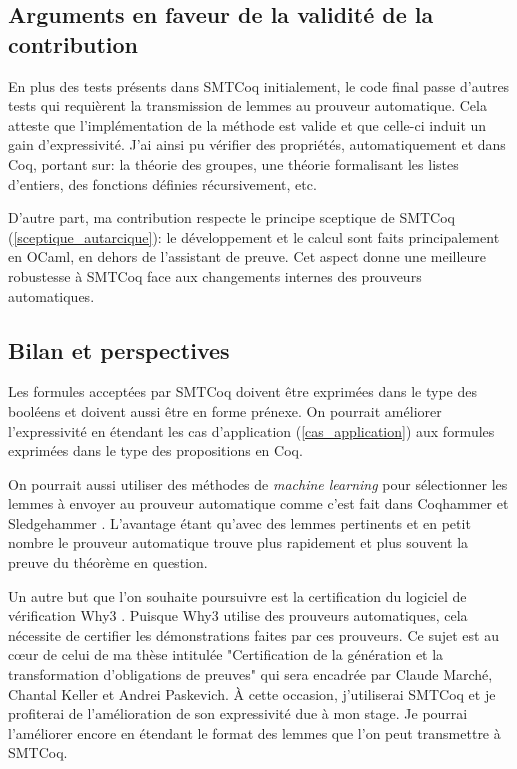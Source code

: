 \documentclass[11pt]{article}
\begin{document}
\subsection{Arguments en faveur de la validité de la contribution}

En plus des tests présents dans SMTCoq initialement, le code final passe d'autres tests qui requièrent la transmission de lemmes au prouveur automatique. Cela atteste  que l'implémentation de la méthode est valide et que celle-ci induit un gain d'expressivité. J'ai ainsi pu vérifier des propriétés, automatiquement et dans Coq, portant sur: la théorie des groupes, une théorie formalisant les listes d'entiers, des fonctions définies récursivement, etc.

D'autre part, ma contribution respecte le principe sceptique de SMTCoq (\ref{sceptique_autarcique}): le développement et le calcul sont faits principalement en OCaml, en dehors de l'assistant de preuve. Cet aspect donne une meilleure robustesse à SMTCoq face aux changements internes des prouveurs automatiques.


\subsection{Bilan et perspectives}\label{persp}

Les formules acceptées par SMTCoq doivent être exprimées dans le type des booléens et doivent aussi être en forme prénexe. On pourrait améliorer l'expressivité en étendant les cas d'application (\ref{cas_application}) aux formules exprimées dans le type des propositions en Coq.

On pourrait aussi utiliser des méthodes de \textit{machine learning} pour sélectionner les lemmes à envoyer au prouveur automatique comme c'est fait dans Coqhammer et Sledgehammer \cite{hol_selector, coqhammer}. L'avantage étant qu'avec des lemmes pertinents et en petit nombre le prouveur automatique trouve plus rapidement et plus souvent la preuve du théorème en question.

Un autre but que l'on souhaite poursuivre est la certification du logiciel de vérification Why3 \cite{why3_intro}. Puisque Why3 utilise des prouveurs automatiques, cela nécessite de certifier les démonstrations faites par ces prouveurs. Ce sujet est au c\oe ur de celui de ma thèse intitulée "Certification de la génération et la transformation d'obligations de preuves" qui sera encadrée par Claude Marché, Chantal Keller et Andrei Paskevich. À cette occasion, j'utiliserai SMTCoq et je profiterai de l'amélioration de son expressivité due à mon stage. Je pourrai l'améliorer encore en étendant le format des lemmes que l'on peut transmettre à SMTCoq. \medbreak
\end{document}
